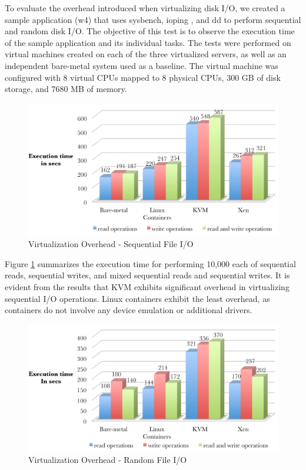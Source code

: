 To evaluate the overhead introduced when virtualizing disk I/O, we created a sample application (w4) that uses sysbench\cite{sysbench}, ioping \cite{ioping}, and dd \cite{dd} to perform sequential and random disk I/O. The objective of this test is to observe the execution time of the sample application and its individual tasks. The tests were performed on virtual machines created on each of the three virtualized servers, as well as an independent bare-metal system used as a baseline. The virtual machine was configured with 8 virtual CPUs mapped to 8 physical CPUs, 300 GB of disk storage, and 7680 MB of memory.

\begin{figure}[H]
\centering
\includegraphics[width=130mm]{diskseq.png}
\caption{Virtualization Overhead - Sequential File I/O}
\label{fig:diskseq}
\end{figure}

Figure \ref{fig:diskseq} summarizes the execution time for performing 10,000 each of sequential reads, sequential writes, and mixed sequential reads and sequential writes. It is evident from the results that KVM exhibits significant overhead in virtualizing sequential I/O operations. Linux containers exhibit the least overhead, as containers do not involve any device emulation or additional drivers.

\begin{figure}[H]
\centering
\includegraphics[width=130mm]{diskrand.png}
\caption{Virtualization Overhead - Random File I/O}
\label{fig:diskrand}
\end{figure}

